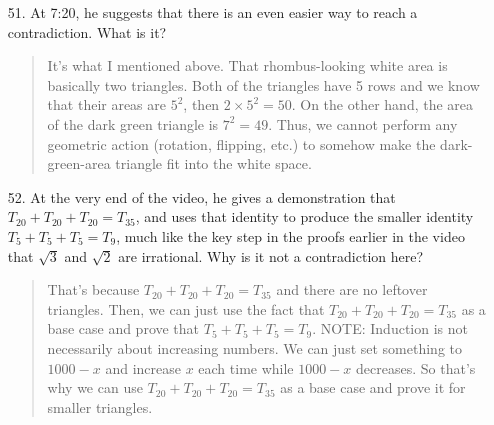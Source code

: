 \documentclass[12pt, a4paper]{article}                      %
\begin{document}
\begin{itemize}
\item[]

\item[51.]
At 7:20, he suggests that there is an even easier way to reach a contradiction. What
is it?
\begin{quote}
It's what I mentioned above. That rhombus-looking white area is basically two triangles.
Both of the triangles have 5 rows and we know that their areas are $5^2$, then $2 \times 5^2 =50$.
On the other hand, the area of the dark green triangle is $7^2 = 49$. Thus, we cannot perform
any geometric action (rotation, flipping, etc.) to somehow make the dark-green-area triangle fit into
the white space.
\end{quote}

\item[]
\item[52.]
At the very end of the video, he gives a demonstration that $T_{20} + T_{20} + T_{20} = T_{35}$, and
uses that identity to produce the smaller identity $T_5 + T_5 + T_5 = T_9$, much like the key step in
the proofs earlier in the video that $\sqrt{3}$ and $\sqrt{2}$ are irrational. Why is it not a contradiction
here?
\begin{quote}
That's because $T_{20} + T_{20} + T_{20} = T_{35}$ and there are no leftover triangles.
Then, we can just use the fact that $T_{20} + T_{20} + T_{20} = T_{35}$ as a base case and prove that $T_5 + T_5 + T_5 = T_9$.
NOTE: Induction is not necessarily about increasing numbers. We can just set something to $1000 - x$ and increase $x$ each time
while $1000 - x$ decreases. So that's why we can use $T_{20} + T_{20} + T_{20} = T_{35}$ as a base case and prove it
for smaller triangles.
\end{quote}


\end{itemize}
\end{document}
